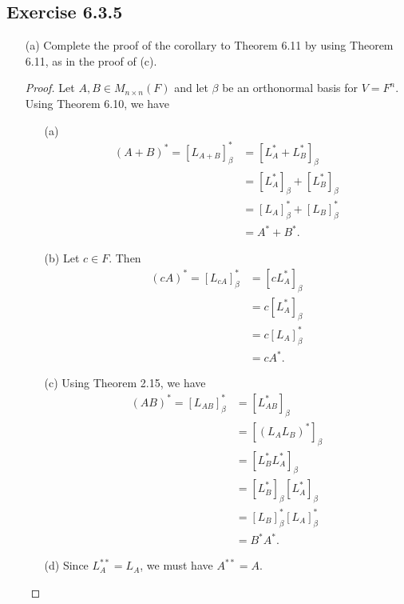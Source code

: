\subsection*{Exercise 6.3.5} 
\begin{enumerate}
    \item[(a)] Complete the proof of the corollary to Theorem 6.11 by using Theorem 6.11, as in the proof of (c).
\begin{proof}
Let \( A,B \in {M}_{n \times n}(F) \) and let \( \beta  \) be an orthonormal basis for \( V = F^{n} \). Using Theorem 6.10, we have
\begin{enumerate}
    \item[(a)] 
        \begin{align*}
            (A+B)^{*} = [{L}_{A+B}]_{\beta}^{*} &= [{L}_{A}^{*} + {L}_{B}^{*} ]_{\beta}  \\
                                   &= [{L}_{A}^{*}]_{\beta} + [{L}_{B}^{*}]_{\beta} \\
                                   &= [{L}_{A}]_{\beta}^{*} + [{L}_{B}]_{\beta}^{*} \\
                                   &= A^{*} + B^{*}.
        \end{align*}
    \item[(b)] Let \( c \in F  \). Then
        \begin{align*}
            (cA)^{*} = [{L}_{cA}]_{\beta}^{*} &= [c {L}_{A}^{*}]_{\beta} \\
                                              &= c [{L}_{A}^{*}]_{\beta} \\
                                              &= c [{L}_{A}]_{\beta}^{*} \\
                                              &= c A^{*}.
        \end{align*}
    \item[(c)] Using Theorem 2.15, we have 
        \begin{align*}
            (AB)^{*} = [{L}_{AB}]_{\beta}^{*} &= [{L}_{AB}^{*}]_{\beta}  \\
                                              &= [({L}_{A} {L}_{B})^{*}]_{\beta} \\
                                              &= [{L}_{B}^{*} {L}_{A}^{*}]_{\beta} \\
                                              &= [{L}_{B}^{*}]_{\beta} [{L}_{A}^{*}]_{\beta} \\
                                              &= [{L}_{B}]_{\beta}^{*} [{L}_{A}]_{\beta}^{*} \\
                                              &= B^{*} A^{*}.
        \end{align*}
    \item[(d)] Since \( {L}_{A}^{* * } = {L}_{A} \), we must have \( A^{**} = A  \).
        

\end{enumerate}
\end{proof}
\end{enumerate}
